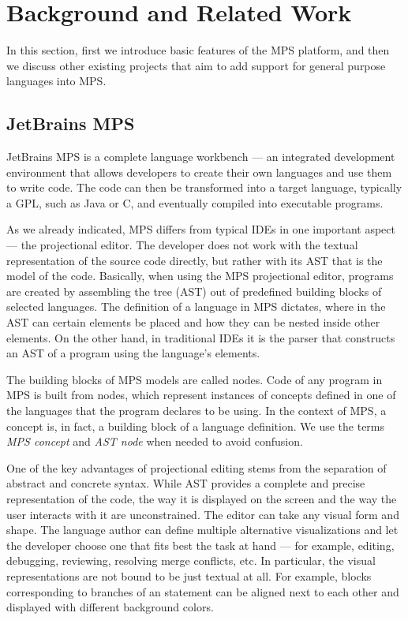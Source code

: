 \section{Background and Related Work}
\label{sect:BACKGRELWORK}

In this section, first we introduce basic features of the MPS platform, and then we discuss other existing projects that aim to add support for general purpose languages into MPS.

\subsection{JetBrains MPS}
\label{sect:MPS}

JetBrains MPS is a complete language workbench --- an integrated development environment that allows developers to create their own languages and use them to write code.
The code can then be transformed into a target language, typically a GPL, such as Java or C, and eventually compiled into executable programs.

As we already indicated, MPS differs from typical IDEs in one important aspect --- the projectional editor.
The developer does not work with the textual representation of the source code directly, but rather with its AST that is the model of the code.
Basically, when using the MPS projectional editor, programs are created by assembling the tree (AST) out of predefined building blocks of selected languages.
The definition of a language in MPS dictates, where in the AST can certain elements be placed and how they can be nested inside other elements.
On the other hand, in traditional IDEs it is the parser that constructs an AST of a program using the language's elements.

The building blocks of MPS models are called nodes.
Code of any program in MPS is built from nodes, which represent instances of concepts defined in one of the languages that the program declares to be using.
In the context of MPS, a concept is, in fact, a building block of a language definition.
We use the terms \emph{MPS concept} and \emph{AST node} when needed to avoid confusion.

One of the key advantages of projectional editing stems from the separation of abstract and concrete syntax.
While AST provides a complete and precise representation of the code, the way it is displayed on the screen and the way the user interacts with it are unconstrained.
The editor can take any visual form and shape.
The language author can define multiple alternative visualizations and let the developer choose one that fits best the task at hand --- for example, editing, debugging, reviewing, resolving merge conflicts, etc.
In particular, the visual representations are not bound to be just textual at all.
For example, blocks corresponding to branches of an  statement can be aligned next to each other and displayed with different background colors.

